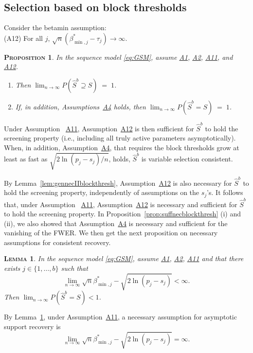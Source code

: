 \documentclass[bj,authoryear]{imsart}
\theoremstyle{plain}
\newtheorem{prop}[thm]{\textsc{Proposition}}
\newtheorem{lem}[thm]{\textsc{Lemma}}
\begin{document}
\subsection{Selection based on block thresholds}

Consider the betamin assumption:\\[5pt]
\hypertarget{lab:A12}{(A12)} \quad For all $j$, \; $\sqrt{n}(\beta_{\min,j}^*-\tau_j) \to \infty$.\\[5pt]
\begin{prop}\label{prop:suffnecIIblockthreshbis}
 In the sequence model \eqref{eq:GSM}, assume \hyperlink{lab:A1}{A1}, \hyperlink{lab:A2}{A2}, \hyperlink{lab:A11}{A11}, and \hyperlink{lab:A12}{A12}.
 \begin{enumerate}[label=(\roman*)]
  \item Then $\lim_{n\to\infty}P(\hat{S}^{b}\supseteq S ) \;=\; 1$.
  \item If, in addition, Assumptions~\hyperlink{lab:A4}{A4} holds, then  $\lim_{n\to\infty}P(\hat{S}^{b}=S  ) \;=\; 1$.
 \end{enumerate}
\end{prop}
Under Assumption ~\hyperlink{lab:A11}{A11}, Assumption~\hyperlink{lab:A12}{A12} is then sufficient for $\hat{S}^{b}$ to hold the screening property (i.e., including all truly active parameters asymptotically). When, in addition, Assumption~\hyperlink{lab:A4}{A4}, that requires the block thresholds grow at least as fast as $\sqrt{2\ln(p_j-s_j)/n}$, holds, $\hat{S}^{b}$ is variable selection consistent.

By Lemma~\ref{lem:gennecIIblockthresh}, Assumption~\hyperlink{lab:A12}{A12} is also necessary for $\hat{S}^{b}$ to hold the screening property, independently of assumptions on the $s_j$'s. It follows that, under Assumption ~\hyperlink{lab:A11}{A11}, Assumption~\hyperlink{lab:A12}{A12} is  necessary and sufficient for $\hat{S}^{b}$ to hold the screening property. In Proposition~\ref{prop:suffnecblockthresh} (i) and (ii), we also showed that Assumption~\hyperlink{lab:A4}{A4} is necessary and sufficient for the vanishing of the FWER. We then get the next proposition on necessary assumptions for consistent recovery.

\begin{lem}\label{lem:necbetaminblockthresh2}
    In the sequence model \eqref{eq:GSM}, assume \hyperlink{lab:A1}{A1}, \hyperlink{lab:A2}{A2}, \hyperlink{lab:A11}{A11} and that there exists $j\in\{1,\ldots,b\}$ such that
\begin{equation}\label{eq:necbetaminblockthreshbis}
      \lim_{n\to \infty}\sqrt{n}\beta_{\min,j}^*-\sqrt{2\ln(p_j-s_j)} < \infty . 
    \end{equation}
Then \;  $\lim_{n \to \infty} P(\hat{S}^{b} = S) < 1$.
\end{lem}
By Lemma~\ref{lem:necbetaminblockthresh2}, under Assumption~\hyperlink{lab:A11}{A11}, a necessary assumption for asymptotic support recovery is
\begin{equation}\label{eq:nectypeIIGSMfinite}
\lim_{n \to \infty} \sqrt{n}\beta_{\min,j}^*-\sqrt{2\ln(p_j-s_j)} = \infty.
\end{equation}
\end{document}
